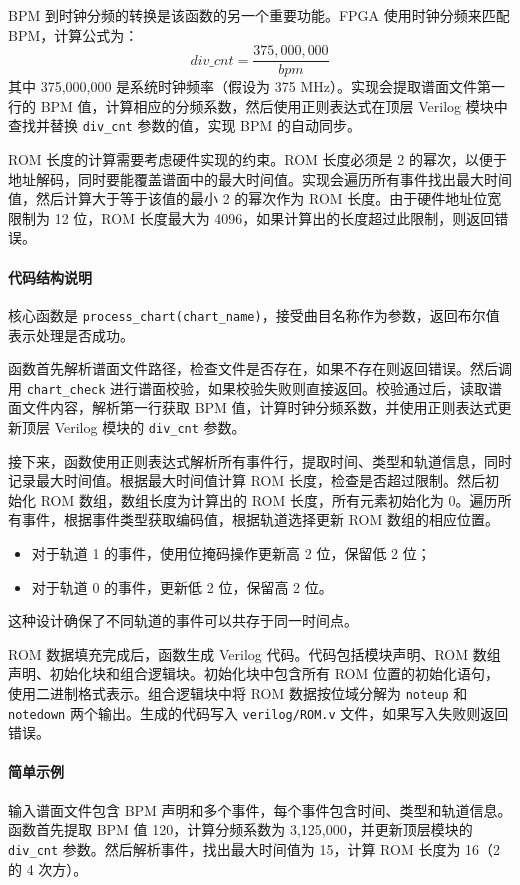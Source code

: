 \documentclass[12pt, a4paper]{article}
\begin{document}
BPM 到时钟分频的转换是该函数的另一个重要功能。FPGA 使用时钟分频来匹配 BPM，计算公式为：
\[ div\_cnt = \frac{375,000,000}{bpm} \]
其中 375,000,000 是系统时钟频率（假设为 375 MHz）。实现会提取谱面文件第一行的 BPM 值，计算相应的分频系数，然后使用正则表达式在顶层 Verilog 模块中查找并替换 \texttt{div\_cnt} 参数的值，实现 BPM 的自动同步。

ROM 长度的计算需要考虑硬件实现的约束。ROM 长度必须是 2 的幂次，以便于地址解码，同时要能覆盖谱面中的最大时间值。实现会遍历所有事件找出最大时间值，然后计算大于等于该值的最小 2 的幂次作为 ROM 长度。由于硬件地址位宽限制为 12 位，ROM 长度最大为 4096，如果计算出的长度超过此限制，则返回错误。

\paragraph{代码结构说明}
核心函数是 \texttt{process\_chart(chart\_name)}，接受曲目名称作为参数，返回布尔值表示处理是否成功。

函数首先解析谱面文件路径，检查文件是否存在，如果不存在则返回错误。然后调用 \texttt{chart\_check} 进行谱面校验，如果校验失败则直接返回。校验通过后，读取谱面文件内容，解析第一行获取 BPM 值，计算时钟分频系数，并使用正则表达式更新顶层 Verilog 模块的 \texttt{div\_cnt} 参数。

接下来，函数使用正则表达式解析所有事件行，提取时间、类型和轨道信息，同时记录最大时间值。根据最大时间值计算 ROM 长度，检查是否超过限制。然后初始化 ROM 数组，数组长度为计算出的 ROM 长度，所有元素初始化为 0。遍历所有事件，根据事件类型获取编码值，根据轨道选择更新 ROM 数组的相应位置。
\begin{itemize}
    \item 对于轨道 1 的事件，使用位掩码操作更新高 2 位，保留低 2 位；
    \item 对于轨道 0 的事件，更新低 2 位，保留高 2 位。
\end{itemize}
这种设计确保了不同轨道的事件可以共存于同一时间点。

ROM 数据填充完成后，函数生成 Verilog 代码。代码包括模块声明、ROM 数组声明、初始化块和组合逻辑块。初始化块中包含所有 ROM 位置的初始化语句，使用二进制格式表示。组合逻辑块中将 ROM 数据按位域分解为 \texttt{noteup} 和 \texttt{notedown} 两个输出。生成的代码写入 \texttt{verilog/ROM.v} 文件，如果写入失败则返回错误。

\paragraph{简单示例}
输入谱面文件包含 BPM 声明和多个事件，每个事件包含时间、类型和轨道信息。函数首先提取 BPM 值 120，计算分频系数为 3,125,000，并更新顶层模块的 \texttt{div\_cnt} 参数。然后解析事件，找出最大时间值为 15，计算 ROM 长度为 16（2 的 4 次方）。
\end{document}
